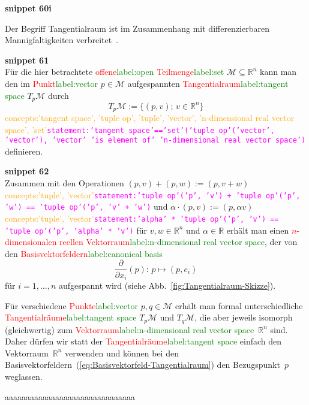 \documentclass[a4paper,twoside,english,ngerman,deutsch,german,sectrefs,envcountsame,envcountchap]{svmono}
\newcommand{\setref}[2]{\textcolor{red}{#1}\textcolor{green}{#2}}
\newcommand{\snippet}[1]{\textbf{snippet #1}\\}
\newcommand{\eqnote}[2]{\textcolor{orange}{#1}\textcolor{magenta}{\texttt{#2}}}
\begin{document}
\snippet{60i}
\begin{remark}
[Tangentialraum]\label{rem:tangentialraum}Der Begriff Tangentialraum ist im Zusammenhang mit differenzierbaren Mannigfaltigkeiten verbreitet~\cite{abraham1983,jaenich2005,lee2006}.

\snippet{61}
Für die hier betrachtete \setref{offene}{label:open} \setref{Teilmenge}{label:set} $\mathcal{M}\subseteq{\mathbb{R}}^{n}$ kann man den im \setref{Punkt}{label:vector} $p\in\mathcal{M}$ aufgespannten \setref{Tangentialraum}{label:tangent space} $T_{p}\mathcal{M}$ durch
\[
T_{p}\mathcal{M}:=\{(p,v);\,v\in{\mathbb{R}}^{n}\}
\]\eqnote{concepts:'tangent space', 'tuple op', 'tuple', 'vector', 'n-dimensional real vector space', 'set'}{statement:'tangent space'=='set'('tuple op'('vector', 'vector'), 'vector' 'is element of' 'n-dimensional real vector space')}
definieren.

\snippet{62}
Zusammen mit den Operationen $(p,v)+(p,w):=(p,v+w)$\eqnote{concepts:'tuple', 'vector'}{statement:'tuple op'('p', 'v') + 'tuple op'('p', 'w') == 'tuple op'('p', 'v' + 'w')} und $\alpha\cdot(p,v):=(p,\alpha v)$\eqnote{concepts:'tuple', 'vector'}{statement:'alpha' * 'tuple op'('p', 'v') == 'tuple op'('p', 'alpha' * 'v')} für $v,w\in{\mathbb{R}}^{n}$ und $\alpha\in{\mathbb{R}}$ erhält man einen \setref{$n$-dimensionalen reellen Vektorraum}{label:n-dimensional real vector space}, der von den
\setref{Basisvektorfeldern}{label:canonical basis}
\begin{equation}
\frac{\partial}{\partial x_{i}}(p):\,p\mapsto(p,e_{i})\label{eq:Basisvektorfeld-Tangentialraum}
\end{equation}
für $i=1,\ldots,n$ aufgespannt wird (siehe Abb.~\ref{fig:Tangentialraum-Skizze}).

Für verschiedene \setref{Punkte}{label:vector} $p,q\in\mathcal{M}$ erhält man formal unterschiedliche \setref{Tangentialräume}{label:tangent space} $T_{p}\mathcal{M}$ und $T_{q}\mathcal{M}$, die aber jeweils isomorph (gleichwertig) zum \setref{Vektorraum}{label:n-dimensional real vector space}~${\mathbb{R}}^{n}$ sind. Daher dürfen wir statt der \setref{Tangentialräume}{label:tangent space} einfach den Vektor\-raum~$\mathbb{R}^{n}$ verwenden und können bei den Basisvektorfeldern~(\eqref{eq:Basisvektorfeld-Tangentialraum}) den Bezugspunkt~$p$ weglassen.
\end{remark}


aaaaaaaaaaaaaaaaaaaaaaaaaaaaaaa


\end{document}
